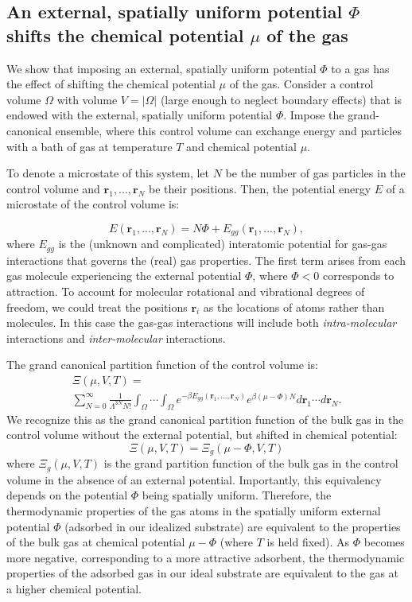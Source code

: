 \documentclass[twoside,twocolumn,9pt]{article}
\newcommand{\rvec}{\mathbf{r}}
\newcommand\V{\Phi}
\begin{document}
\subsection{An external, spatially uniform potential $\V$ shifts the chemical potential $\mu$ of the gas} \label{sec:V_shifts_chem_pot}
We show that imposing an external, spatially uniform potential $\V$ to a gas
has the effect of shifting the chemical potential $\mu$ of the gas. Consider a control volume $\Omega$ with volume
$V=|\Omega|$ (large enough to neglect boundary effects) that is endowed with
the external, spatially uniform potential $\V$. Impose the grand-canonical
ensemble, where this control volume can exchange energy and particles with a
bath of gas at temperature $T$ and chemical potential $\mu$.

To denote a microstate of this system, let $N$ be the number of gas particles
in the control volume and $\mathbf{r}_1,...,\mathbf{r}_N$ be their positions.
Then, the potential energy $E$ of a microstate of the control volume is:

\begin{equation} E(\rvec_1,...,\rvec_N) = N\V +
E_{gg}(\rvec_1,...,\rvec_N),
\end{equation}
where $E_{gg}$ is the (unknown and complicated) interatomic potential for
gas-gas interactions that governs the (real) gas properties. The first term
arises from each gas molecule experiencing the external potential $\V$, where
$\V < 0$ corresponds to attraction. To account for molecular rotational and
vibrational degrees of freedom, we could treat the positions $\rvec_i$ as the
locations of atoms rather than molecules. In this case the gas-gas interactions
will include both \emph{intra-molecular} interactions and
\emph{inter-molecular} interactions.

The grand canonical partition function of the control volume is:
\begin{multline}
    \Xi(\mu, V, T)= \\ \displaystyle \sum_{N=0}^\infty \frac{1}{\Lambda^{3N}N!} \int_{\Omega} \cdots \int_{\Omega} e^{-\beta E_{gg}(\rvec_1, ..., \rvec_N)} e^{\beta (\mu - \V) N} d\rvec_1 \cdots d\rvec_N.
    \label{eq:gcpf}
\end{multline}
We recognize this as the grand canonical partition function of the bulk gas in
the control volume without the external potential, but shifted in chemical
potential:
\begin{equation}
    \Xi(\mu, V, T)=\Xi_g(\mu - \V, V, T)
    \label{eq:xi_vs_xi0}
\end{equation}
where $\Xi_g(\mu, V, T)$ is the grand partition function of the bulk
gas in the control volume in the absence of an external potential. Importantly,
this equivalency depends on the potential $\V$ being spatially uniform.
Therefore, the thermodynamic properties of the gas atoms in the spatially
uniform external potential $\V$ (adsorbed in our idealized substrate)
are equivalent to the properties of the bulk gas at chemical potential $\mu-\V$
(where $T$ is held fixed). As $\V$ becomes more negative, corresponding to a
more attractive adsorbent, the thermodynamic properties of the adsorbed gas in
our ideal substrate are equivalent to the gas at a higher chemical potential.
\end{document}
